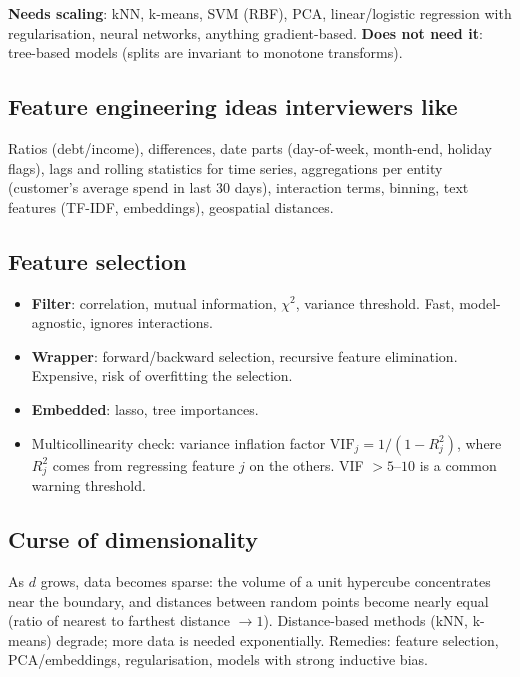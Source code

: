 \textbf{Needs scaling}: kNN, k-means, SVM (RBF), PCA, linear/logistic regression with regularisation, neural networks, anything gradient-based. \textbf{Does not need it}: tree-based models (splits are invariant to monotone transforms).

\subsection{Feature engineering ideas interviewers like}
Ratios (debt/income), differences, date parts (day-of-week, month-end, holiday flags), lags and rolling statistics for time series, aggregations per entity (customer's average spend in last 30 days), interaction terms, binning, text features (TF-IDF, embeddings), geospatial distances.

\subsection{Feature selection}
\begin{itemize}
  \item \textbf{Filter}: correlation, mutual information, $\chi^2$, variance threshold. Fast, model-agnostic, ignores interactions.
  \item \textbf{Wrapper}: forward/backward selection, recursive feature elimination. Expensive, risk of overfitting the selection.
  \item \textbf{Embedded}: lasso, tree importances.
  \item Multicollinearity check: variance inflation factor $\text{VIF}_j=1/(1-R_j^2)$, where $R_j^2$ comes from regressing feature $j$ on the others. VIF $>5$--$10$ is a common warning threshold.
\end{itemize}

\subsection{Curse of dimensionality}
As $d$ grows, data becomes sparse: the volume of a unit hypercube concentrates near the boundary, and distances between random points become nearly equal (ratio of nearest to farthest distance $\to1$). Distance-based methods (kNN, k-means) degrade; more data is needed exponentially. Remedies: feature selection, PCA/embeddings, regularisation, models with strong inductive bias.

